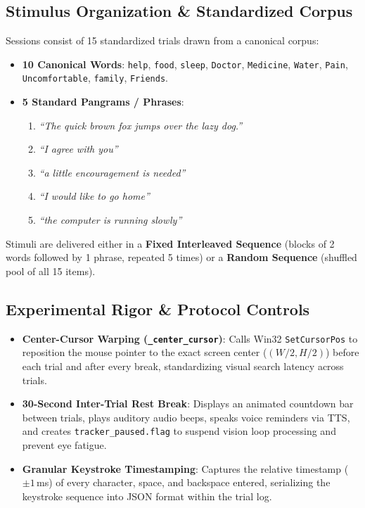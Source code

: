 \documentclass[11pt,a4paper]{article}
\begin{document}
\subsection{Stimulus Organization \& Standardized Corpus}
Sessions consist of 15 standardized trials drawn from a canonical corpus:
\begin{itemize}
    \item \textbf{10 Canonical Words}: \texttt{help}, \texttt{food}, \texttt{sleep}, \texttt{Doctor}, \texttt{Medicine}, \texttt{Water}, \texttt{Pain}, \texttt{Uncomfortable}, \texttt{family}, \texttt{Friends}.
    \item \textbf{5 Standard Pangrams / Phrases}:
    \begin{enumerate}
        \item \emph{``The quick brown fox jumps over the lazy dog.''}
        \item \emph{``I agree with you''}
        \item \emph{``a little encouragement is needed''}
        \item \emph{``I would like to go home''}
        \item \emph{``the computer is running slowly''}
    \end{enumerate}
\end{itemize}
Stimuli are delivered either in a \textbf{Fixed Interleaved Sequence} (blocks of 2 words followed by 1 phrase, repeated 5 times) or a \textbf{Random Sequence} (shuffled pool of all 15 items).

\subsection{Experimental Rigor \& Protocol Controls}
\begin{itemize}
    \item \textbf{Center-Cursor Warping (\texttt{\_center\_cursor})}: Calls Win32 \texttt{SetCursorPos} to reposition the mouse pointer to the exact screen center ($(W/2, H/2)$) before each trial and after every break, standardizing visual search latency across trials.
    \item \textbf{30-Second Inter-Trial Rest Break}: Displays an animated countdown bar between trials, plays auditory audio beeps, speaks voice reminders via TTS, and creates \texttt{tracker\_paused.flag} to suspend vision loop processing and prevent eye fatigue.
    \item \textbf{Granular Keystroke Timestamping}: Captures the relative timestamp ($\pm 1$\,ms) of every character, space, and backspace entered, serializing the keystroke sequence into JSON format within the trial log.
\end{itemize}
\end{document}
